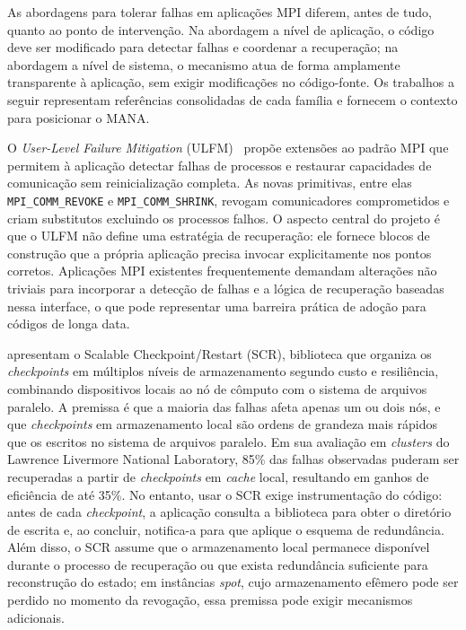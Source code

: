 As abordagens para tolerar falhas em aplicações MPI diferem, antes de tudo,
quanto ao ponto de intervenção. Na abordagem a nível de aplicação, o código
deve ser modificado para detectar falhas e coordenar a recuperação; na abordagem
a nível de sistema, o mecanismo atua de forma amplamente transparente à
aplicação, sem exigir modificações no código-fonte. Os trabalhos a seguir
representam referências consolidadas de cada família e fornecem o contexto
para posicionar o MANA.

O \textit{User-Level Failure Mitigation} (ULFM)~\cite{bland2013ulfm} propõe
extensões ao padrão MPI que permitem à aplicação detectar falhas de processos
e restaurar capacidades de comunicação sem reinicialização completa. As novas
primitivas, entre elas \texttt{MPI\_COMM\_REVOKE} e \texttt{MPI\_COMM\_SHRINK},
revogam comunicadores comprometidos e criam substitutos excluindo os processos
falhos. O aspecto central do projeto é que o ULFM não define uma estratégia
de recuperação: ele fornece blocos de construção que a própria aplicação precisa
invocar explicitamente nos pontos corretos. Aplicações MPI existentes
frequentemente demandam alterações não triviais para incorporar a detecção de
falhas e a lógica de recuperação baseadas nessa interface, o que pode
representar uma barreira prática de adoção para códigos de longa data.

 apresentam o Scalable Checkpoint/Restart (SCR),
biblioteca que organiza os \textit{checkpoints} em múltiplos níveis de
armazenamento segundo custo e resiliência, combinando dispositivos locais ao
nó de cômputo com o sistema de arquivos paralelo. A premissa é que a maioria
das falhas afeta apenas um ou dois nós, e que \textit{checkpoints} em
armazenamento local são ordens de grandeza mais rápidos que os escritos no
sistema de arquivos paralelo. Em sua avaliação em \textit{clusters} do Lawrence
Livermore National Laboratory, 85\% das falhas observadas puderam ser
recuperadas a partir de \textit{checkpoints} em \textit{cache} local,
resultando em ganhos de eficiência de até 35\%. No entanto, usar o SCR
exige instrumentação do código: antes de cada \textit{checkpoint}, a aplicação
consulta a biblioteca para obter o diretório de escrita e, ao concluir,
notifica-a para que aplique o esquema de redundância. Além disso, o SCR
assume que o armazenamento local permanece disponível durante o processo
de recuperação ou que exista redundância suficiente para reconstrução do
estado; em instâncias \textit{spot}, cujo armazenamento efêmero pode ser
perdido no momento da revogação, essa premissa pode exigir mecanismos adicionais.

